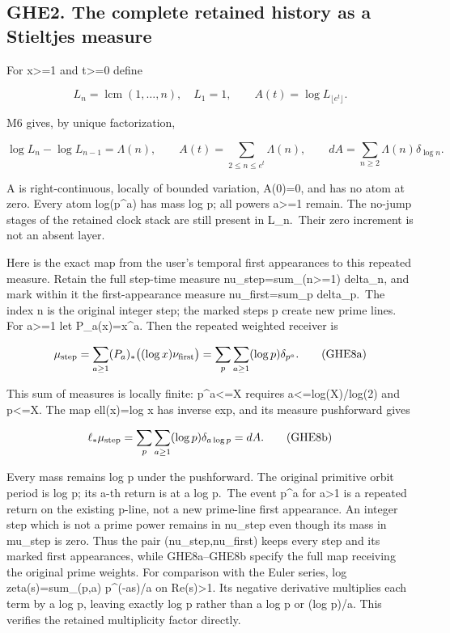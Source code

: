 \subsection{GHE2. The complete retained history as a Stieltjes
measure}\label{ghe2.-the-complete-retained-history-as-a-stieltjes-measure}

For x\textgreater=1 and t\textgreater=0 define

\[
L_n=\operatorname{lcm}(1,\ldots,n),\quad L_1=1,
\qquad A(t)=\log L_{\lfloor e^t\rfloor}.
\tag{GHE7}
\]

M6 gives, by unique factorization,

\[
\log L_n-\log L_{n-1}=\Lambda(n),\qquad
A(t)=\sum_{2\le n\le e^t}\Lambda(n),\qquad
dA=\sum_{n\ge2}\Lambda(n)\delta_{\log n}.
\tag{GHE8}
\]

A is right-continuous, locally of bounded variation, A(0)=0, and has no
atom at zero. Every atom log(p\^{}a) has mass log p; all powers
a\textgreater=1 remain. The no-jump stages of the retained clock stack
are still present in L\_n.~Their zero increment is not an absent layer.

Here is the exact map from the user's temporal first appearances to this
repeated measure. Retain the full step-time measure
nu\_step=sum\_(n\textgreater=1) delta\_n, and mark within it the
first-appearance measure nu\_first=sum\_p delta\_p.~The index n is the
original integer step; the marked steps p create new prime lines. For
a\textgreater=1 let P\_a(x)=x\^{}a. Then the repeated weighted receiver
is

\[
\mu_{\rm step}=\sum_{a\ge1}(P_a)_*
\big((\log x)\nu_{\rm first}\big)
=\sum_p\sum_{a\ge1}(\log p)\delta_{p^a}.
\tag{GHE8a}
\]

This sum of measures is locally finite: p\^{}a\textless=X requires
a\textless=log(X)/log(2) and p\textless=X. The map ell(x)=log x has
inverse exp, and its measure pushforward gives

\[
\ell_*\mu_{\rm step}
=\sum_p\sum_{a\ge1}(\log p)\delta_{a\log p}=dA.
\tag{GHE8b}
\]

Every mass remains log p under the pushforward. The original primitive
orbit period is log p; its a-th return is at a log p.~The event p\^{}a
for a\textgreater1 is a repeated return on the existing p-line, not a
new prime-line first appearance. An integer step which is not a prime
power remains in nu\_step even though its mass in mu\_step is zero. Thus
the pair (nu\_step,nu\_first) keeps every step and its marked first
appearances, while GHE8a--GHE8b specify the full map receiving the
original prime weights. For comparison with the Euler series, log
zeta(s)=sum\_(p,a) p\^{}(-as)/a on Re(s)\textgreater1. Its negative
derivative multiplies each term by a log p, leaving exactly log p rather
than a log p or (log p)/a. This verifies the retained multiplicity
factor directly.

